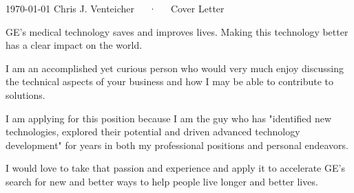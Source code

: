 \documentclass[11pt, letterpaper]{awesome-cv}
\begin{document}
\makecvheader[R]

\makecvfooter
  {\today}
  {Chris J. Venteicher~~~·~~~Cover Letter}
  {}

\makelettertitle

\begin{cvletter}


GE's medical technology saves and improves lives. Making this technology better has a clear impact on the world.





I am an accomplished yet curious person who would very much enjoy discussing
  the technical aspects of your business and how I may be able to contribute to
  solutions.

I am applying for this position because I am the guy who has "identified new technologies, explored their potential and driven advanced technology development"
for years in both my professional positions and personal endeavors.

I would love to take that passion and experience and apply it to accelerate GE's search for new and better ways to help people live longer and better lives.


\end{cvletter}
\end{document}
